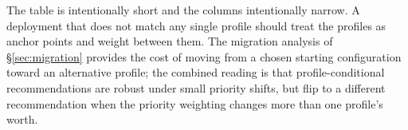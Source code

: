 The table is intentionally short and the columns intentionally narrow.
A deployment that does not match any single profile should treat the
profiles as anchor points and weight between them. The migration
analysis of \S\ref{sec:migration} provides the cost of moving from a
chosen starting configuration toward an alternative profile; the
combined reading is that profile-conditional recommendations are
robust under small priority shifts, but flip to a different
recommendation when the priority weighting changes more than one
profile's worth.
